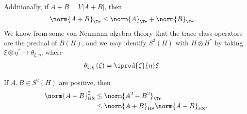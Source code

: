 \documentclass[10pt]{mypackage}
\begin{document}
Additionally, if $A + B = V\left\vert A + B \right\vert$, then
\begin{align*}
  \norm{A + B}_{\Tr} &\leq \norm{A}_{\Tr} + \norm{B}_{\Tr}.
\end{align*}
We know from some von Neumann algebra theory that the trace class operators are the predual of $B(H)$, and we may identify $S^2\left( H \right)$ with $H\otimes H^{\ast}$ by taking $\xi\otimes\eta^{\ast}\mapsto \theta_{\xi,\eta}$, where
\begin{align*}
  \theta_{\xi,\eta}\left( \zeta \right) &= \iprod{\zeta}{\eta}\xi.
\end{align*}
\begin{proposition}
  If $A,B\in S^{2}\left( H \right)$ are positive, then
  \begin{align*}
    \norm{A-B}_{\operatorname{HS}}^2 &\leq \norm{A^2 - B^2}_{\Tr}\\
                                     &\leq \norm{A + B}_{\operatorname{HS}}\norm{A - B}_{\operatorname{HS}}.
  \end{align*}
\end{proposition}
\end{document}
